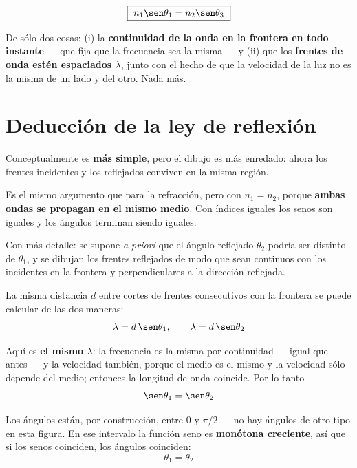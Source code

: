 \documentclass[12pt,a4paper]{article}
\begin{document}
\begin{keybox}
\[
\boxed{\ n_1 \sen\theta_1 = n_2 \sen\theta_3\ }
\]
\end{keybox}



\begin{notebox}
De sólo dos cosas: (i) la \textbf{continuidad de la onda en la frontera en todo
instante} --- que fija que la frecuencia sea la misma --- y (ii) que los
\textbf{frentes de onda estén espaciados $\lambda$}, junto con el hecho de que la
velocidad de la luz no es la misma de un lado y del otro. Nada más.
\end{notebox}

\section{Deducción de la ley de reflexión}

Conceptualmente es \textbf{más simple}, pero el dibujo es más enredado: ahora los
frentes incidentes y los reflejados conviven en la misma región.

\begin{notebox}
Es el mismo argumento que para la refracción, pero con $n_1 = n_2$, porque
\textbf{ambas ondas se propagan en el mismo medio}. Con índices iguales los senos
son iguales y los ángulos terminan siendo iguales.
\end{notebox}

Con más detalle: se supone \emph{a priori} que el ángulo reflejado $\theta_2$
podría ser distinto de $\theta_1$, y se dibujan los frentes reflejados de modo que
sean continuos con los incidentes en la frontera y perpendiculares a la dirección
reflejada.

La misma distancia $d$ entre cortes de frentes consecutivos con la frontera se
puede calcular de las dos maneras:
\[
\lambda = d\,\sen\theta_1, \qquad \lambda = d\,\sen\theta_2
\]

Aquí es \textbf{el mismo $\lambda$}: la frecuencia es la misma por continuidad
--- igual que antes --- y la velocidad también, porque el medio es el mismo y la
velocidad sólo depende del medio; entonces la longitud de onda coincide. Por lo
tanto
\[
\sen\theta_1 = \sen\theta_2
\]

\begin{keybox}
Los ángulos están, por construcción, entre $0$ y $\pi/2$ --- no hay ángulos de
otro tipo en esta figura. En ese intervalo la función seno es \textbf{monótona
creciente}, así que si los senos coinciden, los ángulos coinciden:
\[
\boxed{\ \theta_1 = \theta_2\ }
\]
\end{keybox}
\end{document}
